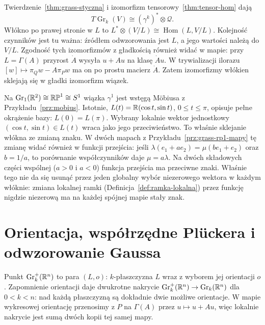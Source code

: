 \begin{uwaga}
Twierdzenie~\ref{thm:grass-styczna} i
izomorfizm tensorowy~\ref{thm:tensor-hom} dają
\[
 T\operatorname{Gr}_k(V)\cong
       (\gamma^k)^*\otimes\mathcal Q.
\]
Włókno po prawej stronie w $L$ to
$L^*\otimes(V/L)\cong\operatorname{Hom}(L,V/L)$.
Kolejność czynników jest tu ważna: źródłem odwzorowania
jest $L$, a jego wartości należą do $V/L$.
Zgodność tych izomorfizmów z gładkością również widać w mapie:
przy $L=\Gamma(A)$ przyrost $\dot A$ wysyła $u+Au$ na
klasę $\dot A u$. W trywializacji ilorazu
$[w]\mapsto\pi_Qw-A\pi_Pw$ ma on po prostu macierz $\dot A$.
Zatem izomorfizmy włókien sklejają się w gładki izomorfizm wiązek.
\end{uwaga}

\begin{przyklad}
Na $\operatorname{Gr}_1(\mathbb{R}^2)\cong\mathbb{RP}^1\cong S^1$
wiązka $\gamma^1$ jest wstęgą Möbiusa z
Przykładu~\ref{prz:mobius}. Istotnie,
$L(t)=\mathbb{R}(\cos t,\sin t)$, $0\leq t\leq\pi$,
opisuje pełne okrążenie bazy: $L(0)=L(\pi)$.
Wybrany lokalnie wektor jednostkowy
$(\cos t,\sin t)\in L(t)$ wraca jako jego
przeciwieństwo. To właśnie sklejanie włókna
ze zmianą znaku.
W dwóch mapach z Przykładu~\ref{prz:grass-rp1-mapy} tę zmianę
widać również w funkcji przejścia: jeśli
$\lambda(e_1+ae_2)=\mu(be_1+e_2)$ oraz $b=1/a$,
to porównanie współczynników daje $\mu=a\lambda$.
Na dwóch składowych części wspólnej ($a>0$ i $a<0$)
funkcja przejścia ma przeciwne znaki. Właśnie tego
nie da się usunąć przez jeden globalny wybór
niezerowego wektora w każdym włóknie: zmiana
lokalnej ramki (Definicja~\ref{def:ramka-lokalna})
przez funkcję nigdzie niezerową
ma na każdej spójnej mapie stały znak.
\end{przyklad}

\section{Orientacja, współrzędne Plückera i odwzorowanie Gaussa}
\label{sec:grass-plucker}

\begin{definicja}
Punkt $\operatorname{Gr}^+_k(\mathbb{R}^n)$ to para $(L,o)$:
$k$-płaszczyzna $L$ wraz z wyborem jej orientacji $o$.
Zapomnienie orientacji daje dwukrotne nakrycie
$\operatorname{Gr}^+_k(\mathbb{R}^n)\to\operatorname{Gr}_k(\mathbb{R}^n)$
dla $0<k<n$: nad każdą płaszczyzną są dokładnie
dwie możliwe orientacje. W mapie wykresowej
orientację przenosimy z $P$ na $\Gamma(A)$ przez
$u\mapsto u+Au$, więc lokalnie nakrycie jest
sumą dwóch kopii tej samej mapy.
\end{definicja}

